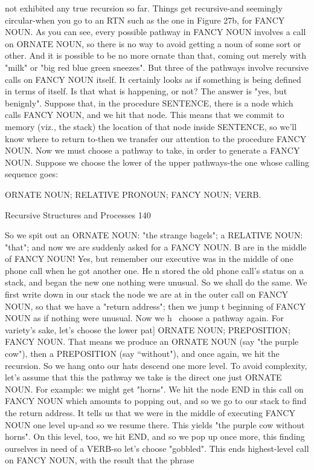 not exhibited any true recursion so far. Things get recursive-and seemingly circular-when
you go to an RTN such as the one in Figure 27b, for FANCY NOUN. As you can see,
every possible pathway in FANCY NOUN involves a call on ORNATE NOUN, so there
is no way to avoid getting a noun of some sort or other. And it is possible to be no more
ornate than that, coming out merely with "milk" or "big red blue green sneezes". But
three of the pathways involve recursive calls on FANCY NOUN itself. It certainly looks
as if something is being defined in terms of itself. Is that what is happening, or not?
        The answer is "yes, but benignly". Suppose that, in the procedure SENTENCE,
there is a node which calls FANCY NOUN, and we hit that node. This means that we
commit to memory (viz., the stack) the location of that node inside SENTENCE, so we'll
know where to return to-then we transfer our attention to the procedure FANCY NOUN.
Now we must choose a pathway to take, in order to generate a FANCY NOUN. Suppose
we choose the lower of the upper pathways-the one whose calling sequence goes:

       ORNATE NOUN; RELATIVE PRONOUN; FANCY NOUN; VERB.




Recursive Structures and Processes                                                   140

So we spit out an ORNATE NOUN: "the strange bagels"; a RELATIVE NOUN:
"that"; and now we are suddenly asked for a FANCY NOUN. B are in the middle of
FANCY NOUN! Yes, but remember our executive was in the middle of one phone call
when he got another one. He n stored the old phone call's status on a stack, and began the
new one nothing were unusual. So we shall do the same.
        We first write down in our stack the node we are at in the outer call on FANCY
NOUN, so that we have a "return address"; then we jump t beginning of FANCY NOUN
as if nothing were unusual. Now we h~ choose a pathway again. For variety's sake, let's
choose the lower pat] ORNATE NOUN; PREPOSITION; FANCY NOUN. That
means we produce an ORNATE NOUN (say "the purple cow"), then a PREPOSITION
(say “without"), and once again, we hit the recursion. So we hang onto our hats descend
one more level. To avoid complexity, let's assume that this the pathway we take is the
direct one just ORNATE NOUN. For example: we might get "horns". We hit the node
END in this call on FANCY NOUN which amounts to popping out, and so we go to our
stack to find the return address. It tells us that we were in the middle of executing
FANCY NOUN one level up-and so we resume there. This yields "the purple cow
without horns". On this level, too, we hit END, and so we pop up once more, this finding
ourselves in need of a VERB-so let's choose "gobbled". This ends highest-level call on
FANCY NOUN, with the result that the phrase

